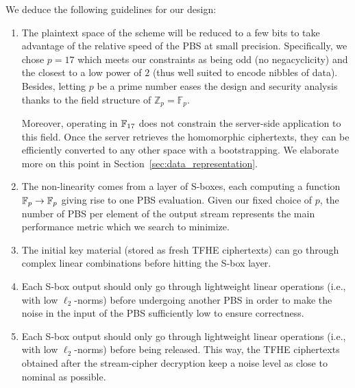 We deduce the following guidelines for our design:
\begin{enumerate}
\item The plaintext space of the scheme will be reduced to a few bits to take advantage of the relative speed of the \gls{PBS} at small precision. Specifically, we chose $p=17$ which meets our constraints as being odd (no negacyclicity) and the closest to a low power of $2$ (thus well suited to encode nibbles of data). Besides, letting $p$ be a prime number eases the design and security analysis thanks to the field structure of $\mathbb{Z}_p = \mathbb{F}_p$.
  
Moreover, operating in $\mathbb{F}_{17}$ does not constrain the server-side application to this field. Once the server retrieves the homomorphic ciphertexts, they can be efficiently converted to any other space with a bootstrapping. We elaborate more on this point in Section~\ref{sec:data_representation}. 


  \item The non-linearity comes from a layer of S-boxes, each computing a function $\mathbb{F}_{p} \to \mathbb{F}_{p}$  giving rise to one \gls{PBS} evaluation. Given our fixed choice of $p$, the number of \gls{PBS} per element of the output stream represents the main performance metric which we search to minimize. 

  
  \item The initial key material (stored as fresh \gls{TFHE} ciphertexts) can go through complex linear combinations
  before hitting the S-box layer.
  
  \item Each S-box output should only go through lightweight linear operations (i.e., with low $\ell_2$-norms) before undergoing another \gls{PBS} in order to make the noise in the input of the \gls{PBS} sufficiently low to ensure correctness.

  
  \item Each S-box output should only go through lightweight linear operations (i.e., with low $\ell_2$-norms) before being
  released. This way, the \gls{TFHE} ciphertexts obtained after the stream-cipher decryption keep a noise level as close to nominal as possible.
\end{enumerate}